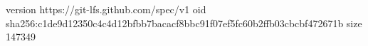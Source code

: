 version https://git-lfs.github.com/spec/v1
oid sha256:c1de9d12350c4c4d12bfbb7bacacf8bbc91f07ef5fc60b2ffb03cbcbf472671b
size 147349
